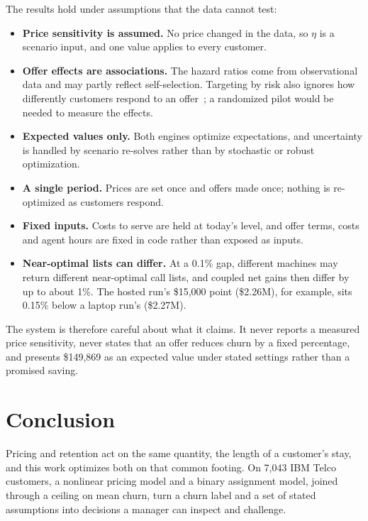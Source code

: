 \documentclass[conference]{IEEEtran}
\begin{document}
The results hold under assumptions that the data cannot test:
\begin{itemize}
\item \textbf{Price sensitivity is assumed.} No price changed in the data, so $\eta$ is a scenario input, and one value applies to every customer.
\item \textbf{Offer effects are associations.} The hazard ratios come from observational data and may partly reflect self-selection. Targeting by risk also ignores how differently customers respond to an offer~\cite{b5}; a randomized pilot would be needed to measure the effects.
\item \textbf{Expected values only.} Both engines optimize expectations, and uncertainty is handled by scenario re-solves rather than by stochastic or robust optimization.
\item \textbf{A single period.} Prices are set once and offers made once; nothing is re-optimized as customers respond.
\item \textbf{Fixed inputs.} Costs to serve are held at today's level, and offer terms, costs and agent hours are fixed in code rather than exposed as inputs.
\item \textbf{Near-optimal lists can differ.} At a 0.1\% gap, different machines may return different near-optimal call lists, and coupled net gains then differ by up to about 1\%. The hosted run's \$15,000 point (\$2.26M), for example, sits 0.15\% below a laptop run's (\$2.27M).
\end{itemize}

The system is therefore careful about what it claims. It never reports a measured price sensitivity, never states that an offer reduces churn by a fixed percentage, and presents \$149,869 as an expected value under stated settings rather than a promised saving.

\section{Conclusion}
\label{sec:concl}

Pricing and retention act on the same quantity, the length of a customer's stay, and this work optimizes both on that common footing. On 7,043 IBM Telco customers, a nonlinear pricing model and a binary assignment model, joined through a ceiling on mean churn, turn a churn label and a set of stated assumptions into decisions a manager can inspect and challenge.
\end{document}
